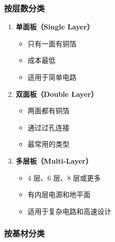 \subsubsection{按层数分类}

\begin{enumerate}
  \item \textbf{单面板（Single Layer）}
    \begin{itemize}
      \item 只有一面有铜箔
      \item 成本最低
      \item 适用于简单电路
    \end{itemize}

  \item \textbf{双面板（Double Layer）}
    \begin{itemize}
      \item 两面都有铜箔
      \item 通过过孔连接
      \item 最常用的类型
    \end{itemize}

  \item \textbf{多层板（Multi-Layer）}
    \begin{itemize}
      \item 4 层、6 层、8 层或更多
      \item 有内层电源和地平面
      \item 适用于复杂电路和高速设计
    \end{itemize}
\end{enumerate}

\subsubsection{按基材分类}

